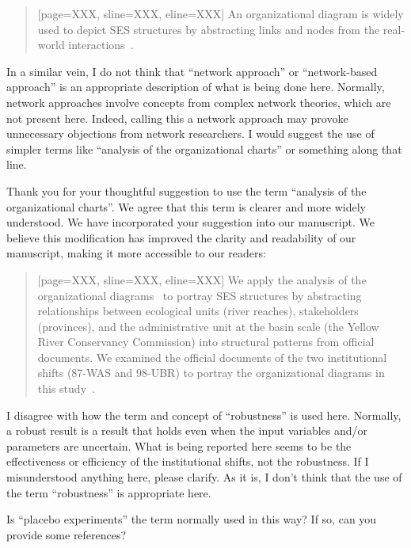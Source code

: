 \begin{quote}[page=XXX, sline=XXX, eline=XXX]
    An organizational diagram is widely used to depict SES structures by abstracting links and nodes from the real-world interactions~\cite{wang2022g,bodin2017a,kluger2020,guerrero2015}.
\end{quote}

\RC{} In a similar vein, I do not think that ``network approach'' or ``network-based approach'' is an appropriate description of what is being done here. Normally, network approaches involve concepts from complex network theories, which are not present here. Indeed, calling this a network approach may provoke unnecessary objections from network researchers. I would suggest the use of simpler terms like ``analysis of the organizational charts'' or something along that line.

\AR{} Thank you for your thoughtful suggestion to use the term ``analysis of the organizational charts''. We agree that this term is clearer and more widely understood. We have incorporated your suggestion into our manuscript. We believe this modification has improved the clarity and readability of our manuscript, making it more accessible to our readers:

\begin{quote}[page=XXX, sline=XXX, eline=XXX]
    We apply the analysis of the organizational diagrams~\cite{bodin2017b} to portray SES structures by abstracting relationships between ecological units (river reaches), stakeholders (provinces), and the administrative unit at the basin scale (the Yellow River Conservancy Commission) into structural patterns from official documents.
    We examined the official documents of the two institutional shifts (87-WAS and 98-UBR) to portray the organizational diagrams in this study~\cite{bodin2017a,kluger2020,guerrero2015}.
\end{quote}

\RC{} I disagree with how the term and concept of ``robustness'' is used here. Normally, a robust result is a result that holds even when the input variables and/or parameters are uncertain. What is being reported here seems to be the effectiveness or efficiency of the institutional shifts, not the robustness. If I misunderstood anything here, please clarify. As it is, I don't think that the use of the term ``robustness'' is appropriate here.

\RC{} Is ``placebo experiments'' the term normally used in this way? If so, can you provide some references?

